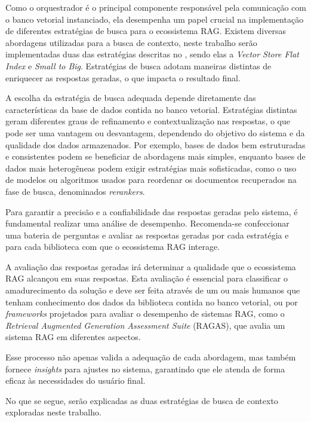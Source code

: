 \documentclass[a4paper, 12pt]{article}
\newcommand{\citeb}[1]{\bibleftbracket\cite{#1}\bibrightbracket}
\begin{document}
    Como o orquestrador é o principal componente responsável pela comunicação com o banco vetorial instanciado, ela desempenha um papel crucial na implementação de diferentes estratégias de busca para o ecossistema RAG. Existem diversas abordagens utilizadas para a busca de contexto, neste trabalho serão implementadas duas das estratégias descritas no , \citeb{retrieval_strategies} sendo elas a \textit{Vector Store Flat Index} e \textit{Small to Big}. Estratégias de busca adotam maneiras distintas de enriquecer as respostas geradas, o que impacta o resultado final.

    A escolha da estratégia de busca adequada depende diretamente das características da base de dados contida no banco vetorial. Estratégias distintas geram diferentes graus de refinamento e contextualização nas respostas, o que pode ser uma vantagem ou desvantagem, dependendo do objetivo do sistema e da qualidade dos dados armazenados. Por exemplo, bases de dados bem estruturadas e consistentes podem se beneficiar de abordagens mais simples, enquanto bases de dados mais heterogêneas podem exigir estratégias mais sofisticadas, como o uso de modelos ou algoritmos usados para reordenar os documentos recuperados na fase de busca, denominados \textit{rerankers}.

    Para garantir a precisão e a confiabilidade das respostas geradas pelo sistema, é fundamental realizar uma análise de desempenho. Recomenda-se confeccionar uma bateria de perguntas e avaliar as respostas geradas por cada estratégia e para cada biblioteca com que o ecossistema RAG interage.

    A avaliação das respostas geradas irá determinar a qualidade que o ecossistema RAG alcançou em suas respostas. Esta avaliação é essencial para classificar o amadurecimento da solução e deve ser feita através de um ou mais humanos que tenham conhecimento dos dados da biblioteca contida no banco vetorial, ou por \textit{frameworks} projetados para avaliar o desempenho de sistemas RAG, como o \textit{Retrieval Augmented Generation Assessment Suite} (RAGAS), que avalia um sistema RAG em diferentes aspectos.
    
    Esse processo não apenas valida a adequação de cada abordagem, mas também fornece \textit{insights} para ajustes no sistema, garantindo que ele atenda de forma eficaz às necessidades do usuário final.

    No que se segue, serão explicadas as duas estratégias de busca de contexto exploradas neste trabalho.
\end{document}

